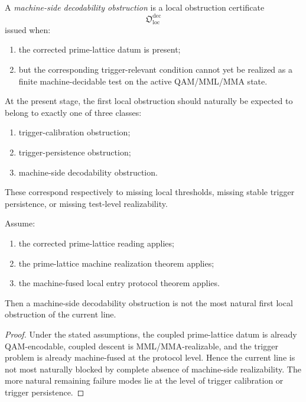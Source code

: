 \begin{definition}
\label{def:machine-side-decodability-obstruction}
A \emph{machine-side decodability obstruction} is a local obstruction certificate
\[
\mathfrak{O}_{\mathrm{loc}}^{\mathrm{dec}}
\]
issued when:
\begin{enumerate}
 \item the corrected prime-lattice datum is present;
 \item but the corresponding trigger-relevant condition cannot yet be realized as a finite machine-decidable test on the active QAM/MML/MMA state.
\end{enumerate}
\end{definition}

\begin{remark}
\label{rem:the-three-natural-first-obstruction-types}
At the present stage, the first local obstruction should naturally be expected to belong to exactly one of three classes:
\begin{enumerate}
 \item trigger-calibration obstruction;
 \item trigger-persistence obstruction;
 \item machine-side decodability obstruction.
\end{enumerate}
These correspond respectively to missing local thresholds, missing stable trigger persistence, or missing test-level realizability.
\end{remark}

\begin{proposition}
\label{prop:machine-side-decodability-not-primary-current-obstruction}
Assume:
\begin{enumerate}
 \item the corrected prime-lattice reading applies;
 \item the prime-lattice machine realization theorem applies;
 \item the machine-fused local entry protocol theorem applies.
\end{enumerate}
Then a machine-side decodability obstruction is not the most natural first local obstruction of the current line.
\end{proposition}

\begin{proof}
Under the stated assumptions, the coupled prime-lattice datum is already QAM-encodable, coupled descent is MML/MMA-realizable, and the trigger problem is already machine-fused at the protocol level.
Hence the current line is not most naturally blocked by complete absence of machine-side realizability.
The more natural remaining failure modes lie at the level of trigger calibration or trigger persistence.
\end{proof}

